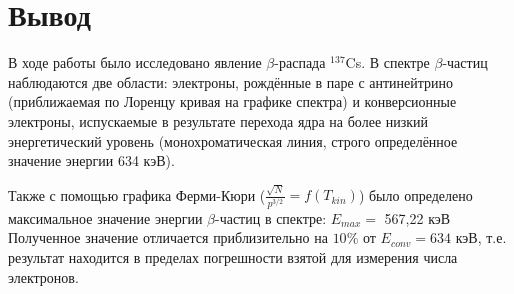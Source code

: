 \documentclass[15pt,a5paper,reqno]{article}
\begin{document}
\section{Вывод}
	В ходе работы было исследовано явление $\beta$-распада $^{137}$Cs. В спектре $\beta$-частиц наблюдаются две области: электроны, рождённые в паре с антинейтрино (приближаемая по Лоренцу кривая на графике спектра) и конверсионные электроны, испускаемые в результате перехода ядра на более низкий энергетический уровень (монохроматическая линия, строго определённое значение энергии 634 кэВ). \par
	Также с помощью графика Ферми-Кюри ($\frac{\sqrt{N}}{p^{3/2}} = f(T_{kin})$) было определено максимальное значение энергии $\beta$-частиц в спектре: $E_{max} = $ 567,22 кэВ
	Полученное значение отличается приблизительно на $10 \%$ от $E_{conv} = 634$ кэВ, т.е. результат находится в пределах погрешности взятой для измерения числа электронов.
\end{document}
